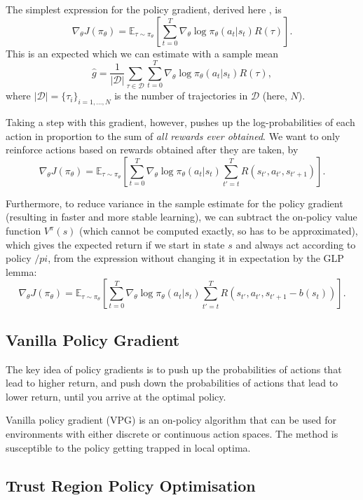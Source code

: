 \documentclass{article}
\begin{document}
The simplest expression for the policy gradient, derived here \cite{}, is $$\nabla_\theta J(\pi_\theta) = \mathbb{E}_{\tau \sim \pi_\theta} \left[ \sum_{t=0}^T \nabla_\theta \log \pi_\theta(a_t | s_t) R(\tau) \right].$$ This is an expected which we can estimate with a sample mean $$\hat{g} = \frac{1}{\lvert \mathcal{D} \rvert} \sum_{\tau \in \mathcal{D}} \sum_{t=0}^T \nabla_\theta \log \pi_\theta(a_t | s_t) R(\tau),$$ where $\lvert \mathcal{D} \rvert = \{ \tau_i \}_{i=1, \dots, N}$ is the number of trajectories in $\mathcal{D}$ (here, $N$).

Taking a step with this gradient, however, pushes up the log-probabilities of each action in proportion to the sum of \textit{all rewards ever obtained}. We want to only reinforce actions based on rewards obtained after they are taken, by $$\nabla_\theta J(\pi_\theta) = \mathbb{E}_{\tau \sim \pi_\theta} \left[ \sum_{t=0}^T \nabla_\theta \log \pi_\theta(a_t | s_t) \sum_{t'=t}^T R(s_{t'}, a_{t'}, s_{t'+1}) \right].$$

Furthermore, to reduce variance in the sample estimate for the policy gradient (resulting in faster and more stable learning), we can subtract the on-policy value function $V^\pi(s)$ (which cannot be computed exactly, so has to be approximated), which gives the expected return if we start in state $s$ and always act according to policy $/pi$, from the expression without changing it in expectation by the GLP lemma: $$\nabla_\theta J(\pi_\theta) = \mathbb{E}_{\tau \sim \pi_\theta} \left[ \sum_{t=0}^T \nabla_\theta \log \pi_\theta(a_t | s_t) \sum_{t'=t}^T R \left( s_{t'}, a_{t'}, s_{t'+1} - b(s_t)\right) \right].$$ 

\subsection{Vanilla Policy Gradient}

The key idea of policy gradients is to push up the probabilities of actions that lead to higher return, and push down the probabilities of actions that lead to lower return, until you arrive at the optimal policy.

Vanilla policy gradient (VPG) is an on-policy algorithm that can be used for environments with either discrete or continuous action spaces. The method is susceptible to the policy getting trapped in local optima.

\subsection{Trust Region Policy Optimisation}
\end{document}
